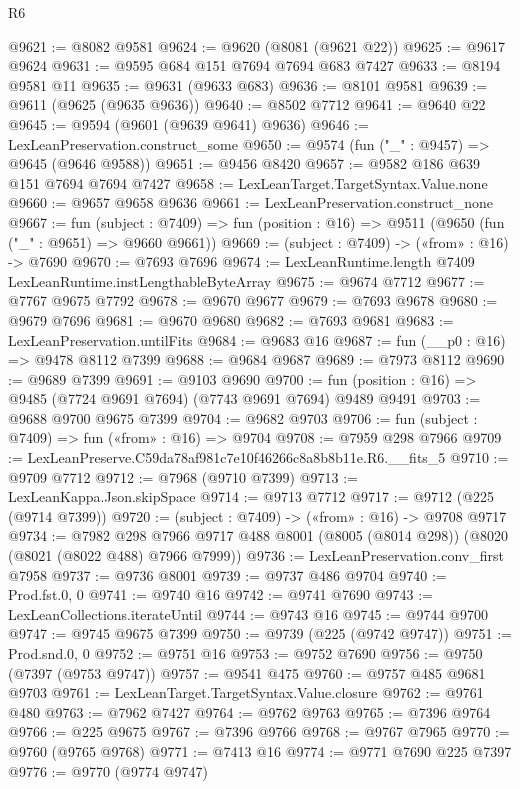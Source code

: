 \begin{lexlean}{R6}
\begin{coremodule}
@9621 := @8082 @9581
@9624 := @9620 (@8081 (@9621 @22))
@9625 := @9617 @9624
@9631 := @9595 @684 @151 @7694 @7694 @683 @7427
@9633 := @8194 @9581 @11
@9635 := @9631 (@9633 @683)
@9636 := @8101 @9581
@9639 := @9611 (@9625 (@9635 @9636))
@9640 := @8502 @7712
@9641 := @9640 @22
@9645 := @9594 (@9601 (@9639 @9641) @9636)
@9646 := LexLeanPreservation.construct_some
@9650 := @9574 (fun ("_" : @9457) => @9645 (@9646 @9588))
@9651 := @9456 @8420
@9657 := @9582 @186 @639 @151 @7694 @7694 @7427
@9658 := LexLeanTarget.TargetSyntax.Value.none
@9660 := @9657 @9658 @9636
@9661 := LexLeanPreservation.construct_none
@9667 := fun (subject : @7409) =>
  fun (position : @16) => @9511 (@9650 (fun ("_" : @9651) => @9660 @9661))
@9669 := (subject : @7409) -> («from» : @16) -> @7690
@9670 := @7693 @7696
@9674 := LexLeanRuntime.length @7409 LexLeanRuntime.instLengthableByteArray
@9675 := @9674 @7712
@9677 := @7767 @9675 @7792
@9678 := @9670 @9677
@9679 := @7693 @9678
@9680 := @9679 @7696
@9681 := @9670 @9680
@9682 := @7693 @9681
@9683 := LexLeanPreservation.untilFits
@9684 := @9683 @16
@9687 := fun (__p0 : @16) => @9478 @8112 @7399
@9688 := @9684 @9687
@9689 := @7973 @8112
@9690 := @9689 @7399
@9691 := @9103 @9690
@9700 := fun (position : @16) => @9485 (@7724 @9691 @7694) (@7743 @9691 @7694) @9489 @9491
@9703 := @9688 @9700 @9675 @7399
@9704 := @9682 @9703
@9706 := fun (subject : @7409) => fun («from» : @16) => @9704
@9708 := @7959 @298 @7966
@9709 := LexLeanPreserve.C59da78af981c7e10f46266c8a8b8b11e.R6.__fits_5
@9710 := @9709 @7712
@9712 := @7968 (@9710 @7399)
@9713 := LexLeanKappa.Json.skipSpace
@9714 := @9713 @7712
@9717 := @9712 (@225 (@9714 @7399))
@9720 := (subject : @7409) -> («from» : @16) -> @9708 @9717
@9734 := @7982
    @298
    @7966
    @9717
    @488
    @8001
    (@8005 (@8014 @298))
    (@8020 (@8021 (@8022 @488) @7966 @7999))
@9736 := LexLeanPreservation.conv_first @7958
@9737 := @9736 @8001
@9739 := @9737 @486 @9704
@9740 := Prod.fst.{0, 0}
@9741 := @9740 @16
@9742 := @9741 @7690
@9743 := LexLeanCollections.iterateUntil
@9744 := @9743 @16
@9745 := @9744 @9700
@9747 := @9745 @9675 @7399
@9750 := @9739 (@225 (@9742 @9747))
@9751 := Prod.snd.{0, 0}
@9752 := @9751 @16
@9753 := @9752 @7690
@9756 := @9750 (@7397 (@9753 @9747))
@9757 := @9541 @475
@9760 := @9757 @485 @9681 @9703
@9761 := LexLeanTarget.TargetSyntax.Value.closure
@9762 := @9761 @480
@9763 := @7962 @7427
@9764 := @9762 @9763
@9765 := @7396 @9764
@9766 := @225 @9675
@9767 := @7396 @9766
@9768 := @9767 @7965
@9770 := @9760 (@9765 @9768)
@9771 := @7413 @16
@9774 := @9771 @7690 @225 @7397
@9776 := @9770 (@9774 @9747)

\end{coremodule}
\end{lexlean}
